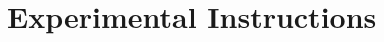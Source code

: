 \documentclass[11 pt]{article}
\begin{document}


\newpage

\section{Experimental Instructions}
\label{app:experimental-instructions}

%
\end{document}
